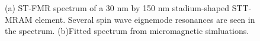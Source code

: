 \begin{figure}[!ht]
\centering
{}
\caption{(a) ST-FMR spectrum of a 30 nm by 150 nm stadium-shaped STT-MRAM element. Several spin wave eignemode resonances are seen in the spectrum. (b)Fitted spectrum from micromagnetic simluations.}
\end{figure}

